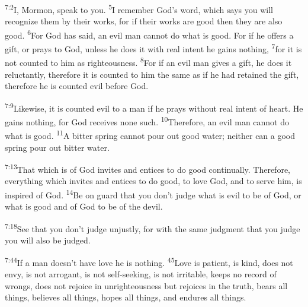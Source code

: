 \documentclass[openany,12pt,english]{book}
\newenvironment{para}{\par\pretolerance=100\tolerance=200\setlength{\emergencystretch}{0.6em}\relax}{\par}
\begin{document}
\begin{para}
    \textsuperscript{7:2}\thinspace{}I, Mormon, speak to you.
    \textsuperscript{5}\thinspace{}I re\-mem\-ber God's word, which says you will rec\-og\-nize them by their works, for if their works are good then they are al\-so good.
    \textsuperscript{6}\thinspace{}For God has said, an evil man can\-not do what is good. For if he offers a gift, or prays to God, un\-less he does it with re\-al in\-tent he gains noth\-ing,
    \textsuperscript{7}\thinspace{}for it is not counted to him as right\-eous\-ness.
    \textsuperscript{8}\thinspace{}For if an evil man gives a gift, he does it re\-luc\-tant\-ly, there\-fore it is counted to him the same as if he had retained the gift, there\-fore he is counted evil be\-fore God.
\end{para}

\begin{para}
    \textsuperscript{7:9}\thinspace{}Like\-wise, it is counted evil to a man if he prays with\-out re\-al in\-tent of heart. He gains noth\-ing, for God receives none such.
    \textsuperscript{10}\thinspace{}There\-fore, an evil man can\-not do what is good.
    \textsuperscript{11}\thinspace{}A bit\-ter spring can\-not pour out good wa\-ter; nei\-ther can a good spring pour out bit\-ter wa\-ter.
\end{para}

\begin{para}
    \textsuperscript{7:13}\thinspace{}That which is of God invites and entices to do good con\-tin\-u\-al\-ly. There\-fore, eve\-ry\-thing which invites and entices to do good, to love God, and to serve him, is in\-spired of God.
    \textsuperscript{14}\thinspace{}Be on guard that you don't judge what is evil to be of God, or what is good and of God to be of the dev\-il.
\end{para}

\begin{para}
    \textsuperscript{7:18}\thinspace{}See that you don't judge un\-just\-ly, for with the same judg\-ment that you judge you will al\-so be judged.
\end{para}

\bigskip{}

\begin{para}
    \textsuperscript{7:44}\thinspace{}If a man does\-n't have love he is noth\-ing.
    \textsuperscript{45}\thinspace{}Love is pa\-tient, is kind, does not en\-vy, is not ar\-ro\-gant, is not self-seeking, is not ir\-ri\-ta\-ble, keeps no rec\-ord of wrongs, does not re\-joice in unrighteousness but rejoices in the truth, bears all things, believes all things, hopes all things, and endures all things.
\end{para}
\end{document}
